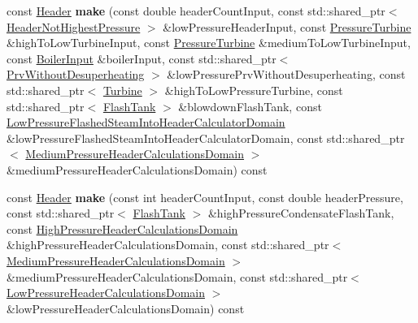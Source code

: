 \begin{DoxyCompactItemize}
\mbox{\label{class_header_factory_ad931f2f01ecb84905f083bbbab8324f2}} 
const \hyperlink{class_header}{Header} {\bfseries make} (const double header\+Count\+Input, const std\+::shared\+\_\+ptr$<$ \hyperlink{class_header_not_highest_pressure}{Header\+Not\+Highest\+Pressure} $>$ \&low\+Pressure\+Header\+Input, const \hyperlink{class_pressure_turbine}{Pressure\+Turbine} \&high\+To\+Low\+Turbine\+Input, const \hyperlink{class_pressure_turbine}{Pressure\+Turbine} \&medium\+To\+Low\+Turbine\+Input, const \hyperlink{class_boiler_input}{Boiler\+Input} \&boiler\+Input, const std\+::shared\+\_\+ptr$<$ \hyperlink{class_prv_without_desuperheating}{Prv\+Without\+Desuperheating} $>$ \&low\+Pressure\+Prv\+Without\+Desuperheating, const std\+::shared\+\_\+ptr$<$ \hyperlink{class_turbine}{Turbine} $>$ \&high\+To\+Low\+Pressure\+Turbine, const std\+::shared\+\_\+ptr$<$ \hyperlink{class_flash_tank}{Flash\+Tank} $>$ \&blowdown\+Flash\+Tank, const \hyperlink{class_low_pressure_flashed_steam_into_header_calculator_domain}{Low\+Pressure\+Flashed\+Steam\+Into\+Header\+Calculator\+Domain} \&low\+Pressure\+Flashed\+Steam\+Into\+Header\+Calculator\+Domain, const std\+::shared\+\_\+ptr$<$ \hyperlink{class_medium_pressure_header_calculations_domain}{Medium\+Pressure\+Header\+Calculations\+Domain} $>$ \&medium\+Pressure\+Header\+Calculations\+Domain) const
\item 
\mbox{\label{class_header_factory_acd1afb01f528d0113f3885ddb6097aa7}} 
const \hyperlink{class_header}{Header} {\bfseries make} (const int header\+Count\+Input, const double header\+Pressure, const std\+::shared\+\_\+ptr$<$ \hyperlink{class_flash_tank}{Flash\+Tank} $>$ \&high\+Pressure\+Condensate\+Flash\+Tank, const \hyperlink{class_high_pressure_header_calculations_domain}{High\+Pressure\+Header\+Calculations\+Domain} \&high\+Pressure\+Header\+Calculations\+Domain, const std\+::shared\+\_\+ptr$<$ \hyperlink{class_medium_pressure_header_calculations_domain}{Medium\+Pressure\+Header\+Calculations\+Domain} $>$ \&medium\+Pressure\+Header\+Calculations\+Domain, const std\+::shared\+\_\+ptr$<$ \hyperlink{class_low_pressure_header_calculations_domain}{Low\+Pressure\+Header\+Calculations\+Domain} $>$ \&low\+Pressure\+Header\+Calculations\+Domain) const
\item 
\mbox{\label{class_header_factory_afe118d8149774dbd570bee38352b43b2}} 

\end{DoxyCompactItemize}
